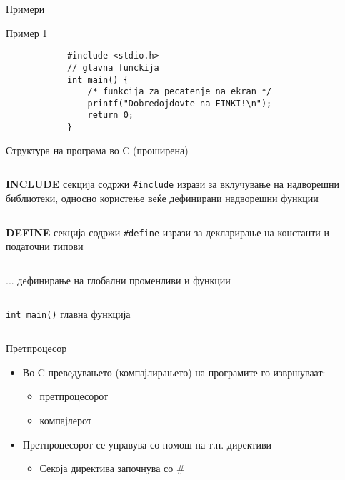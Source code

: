 \begin{frame}[fragile]{Примери}
	\begin{exampleblock}{Пример 1}
		\begin{lstlisting}
			#include <stdio.h>
			// glavna funckija
			int main() {
			    /* funkcija za pecatenje na ekran */
			    printf("Dobredojdovte na FINKI!\n");
			    return 0;
			}
		\end{lstlisting}
	\end{exampleblock}
\end{frame}

\begin{frame}{Структура на програма во C (проширена)}
	\begin{columns}
		\textbf{INCLUDE} секција
		 содржи \texttt{\#include} изрази за вклучување на надворешни библиотеки, односно користење веќе дефинирани надворешни функции
	\end{columns}
	\hfill
	\linebreak
	\begin{columns}
		\column{.2\textwidth}
		\textbf{DEFINE} секција
		 содржи \texttt{\#define} изрази за декларирање на константи и податочни типови
	\end{columns}	
	\hfill
	\linebreak
	\begin{columns}
		...
		 дефинирање на глобални променливи и функции
	\end{columns}
	\hfill
	\linebreak
	\begin{columns}
		\column{.2\textwidth}
		\texttt{int main()}
		 главна функција
	\end{columns}
\end{frame}

\begin{frame}{Претпроцесор}
\begin{itemize}
	\item Во C преведувањето (компајлирањето) на програмите го извршуваат:
	\begin{itemize}
		\item претпроцесорот
		\item компајлерот
	\end{itemize}
	\item Претпроцесорот се управува со помош на т.н. директиви
	\begin{itemize}
		\item Секоја директива започнува со \#
	\end{itemize}
\end{itemize}
\end{frame}

